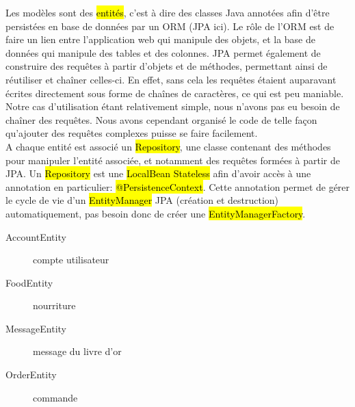 Les modèles sont des \hl{entités}, c'est à dire des classes Java annotées afin
d'être persistées en base de données par un ORM (JPA ici). Le rôle de l'ORM est
de faire un lien entre l'application web qui manipule des objets, et la base de
données qui manipule des tables et des colonnes. JPA permet également de
construire des requêtes à partir d'objets et de méthodes, permettant ainsi de
réutiliser et chaîner celles-ci. En effet, sans cela les requêtes étaient
auparavant écrites directement sous forme de chaînes de caractères, ce qui est
peu maniable.\\

Notre cas d'utilisation étant relativement simple, nous n'avons pas eu besoin
de chaîner des requêtes. Nous avons cependant organisé le code de telle façon
qu'ajouter des requêtes complexes puisse se faire facilement.\\

A chaque entité est associé un \hl{Repository}, une classe contenant des méthodes
pour manipuler l'entité associée, et notamment des requêtes formées à partir
de JPA. Un \hl{Repository} est une \hl{LocalBean Stateless} afin d'avoir
accès à une annotation en particulier: \hl{@PersistenceContext}. Cette
annotation permet de gérer le cycle de vie d'un \hl{EntityManager} JPA
(création et destruction) automatiquement, pas besoin donc de créer une
\hl{EntityManagerFactory}.\\

\begin{description}
    \item[AccountEntity] compte utilisateur
    \item[FoodEntity] nourriture
    \item[MessageEntity] message du livre d'or
    \item[OrderEntity] commande
\end{description}

